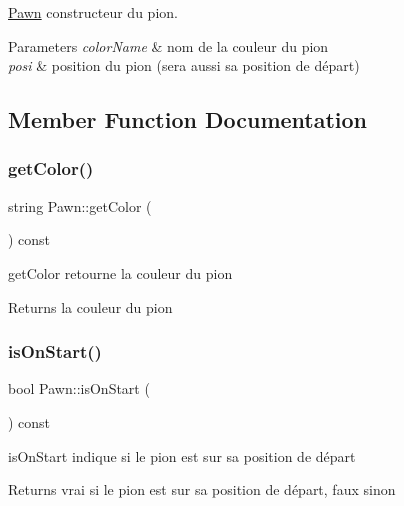 \mbox{\hyperlink{class_pawn}{Pawn}} constructeur du pion. 


\begin{DoxyParams}{Parameters}
{\em color\+Name} & nom de la couleur du pion \\
\hline
{\em posi} & position du pion (sera aussi sa position de départ) \\
\hline
\end{DoxyParams}


\subsection{Member Function Documentation}
\mbox{\label{class_pawn_a3608fc8df7d72f124ff2baa1fd1b6927}} 
\subsubsection{\texorpdfstring{getColor()}{getColor()}}
{\footnotesize\ttfamily string Pawn\+::get\+Color (\begin{DoxyParamCaption}{ }\end{DoxyParamCaption}) const\hspace{0.3cm}{\ttfamily [inline]}}



get\+Color retourne la couleur du pion 

\begin{DoxyReturn}{Returns}
la couleur du pion 
\end{DoxyReturn}
\mbox{\label{class_pawn_a9758ec0052198a4afe983d9a5430736d}} 
\subsubsection{\texorpdfstring{isOnStart()}{isOnStart()}}
{\footnotesize\ttfamily bool Pawn\+::is\+On\+Start (\begin{DoxyParamCaption}{ }\end{DoxyParamCaption}) const\hspace{0.3cm}{\ttfamily [inline]}}



is\+On\+Start indique si le pion est sur sa position de départ 

\begin{DoxyReturn}{Returns}
vrai si le pion est sur sa position de départ, faux sinon 
\end{DoxyReturn}
\mbox{\label{class_pawn_a5fb75477bb2d47d0fdbb6e3b92d157cf}} 
